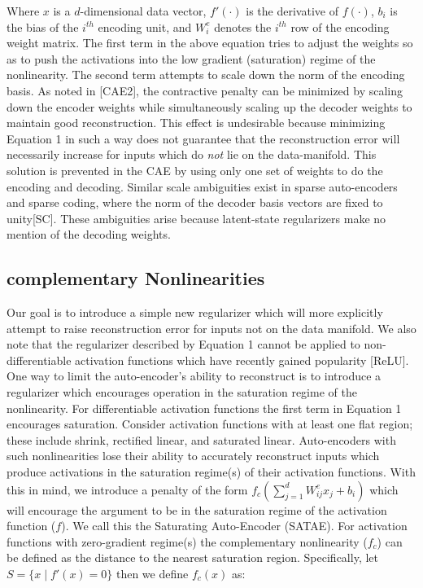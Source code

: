 \documentclass{article} %
\begin{document}
\noindent
Where $x$ is a $d$-dimensional data vector, $f'(\cdot)$ is the derivative of $f(\cdot)$, $b_i$ is the bias of the $i^{th}$ encoding unit, and $W^e_i$ denotes the $i^{th}$ row of the encoding weight matrix. The first term in the above equation tries to adjust the weights so as to push the activations into the low gradient (saturation) regime of the nonlinearity. The second term attempts to scale down the norm of the encoding basis. As noted in [CAE2], the contractive penalty can be minimized by scaling down the encoder weights while simultaneously scaling up the decoder weights to maintain good reconstruction. This effect is undesirable because minimizing Equation 1 in such a way does not guarantee that the reconstruction error will necessarily increase for inputs which do \emph{not} lie on the data-manifold. This solution is prevented in the CAE by using only one set of weights to do the encoding and decoding. Similar scale ambiguities exist in sparse auto-encoders and sparse coding, where the norm of the decoder basis vectors are fixed to unity[SC]. These ambiguities arise because latent-state regularizers make no mention of the decoding weights. 

\subsection{complementary Nonlinearities}     
Our goal is to introduce a simple new regularizer which will more explicitly attempt to raise reconstruction error for inputs not on the data manifold.  We also note that the regularizer described by Equation 1 cannot be applied to non-differentiable activation functions which have recently gained popularity [ReLU]. One way to limit the auto-encoder's ability to reconstruct is to introduce a regularizer which encourages operation in the saturation regime of the nonlinearity. For differentiable activation functions the first term in Equation 1 encourages saturation. Consider activation functions with at least one flat region; these include shrink, rectified linear, and saturated linear. Auto-encoders with such nonlinearities lose their ability to accurately reconstruct inputs which produce activations in the saturation regime(s) of their activation functions. With this in mind, we introduce a penalty of the form $f_c(\sum_{j=1}^d W^e_{ij}x_j + b_i)$ which will encourage the argument to be in the saturation regime of the activation function ($f$). We call this the Saturating Auto-Encoder (SATAE). For activation functions with zero-gradient regime(s) the complementary nonlinearity ($f_c$) can be defined as the distance to the nearest saturation region. Specifically, let $S = \{x \mid  f'(x) = 0\}$ then we define $f_c(x)$ as: 
\end{document}

